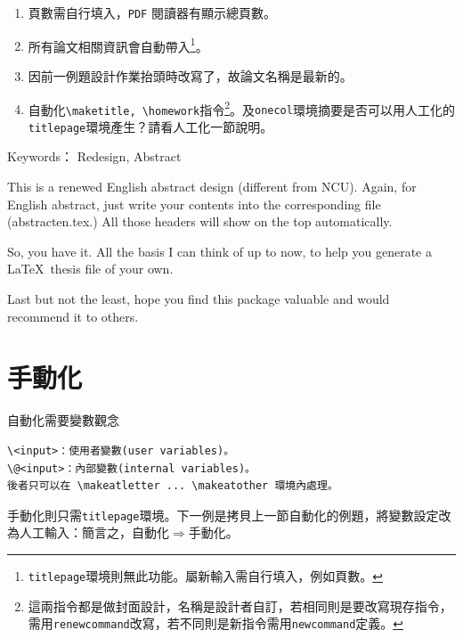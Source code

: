 \begin{appendB}
\begin{abstractcn}
\begin{enumerate}
\item 頁數需自行填入，{\tt PDF} 閱讀器有顯示總頁數。
\item 所有論文相關資訊會自動帶入\footnote{{\tt titlepage}環境則無此功能。屬新輸入需自行填入，例如頁數。}。
\item 因前一例題設計作業抬頭時改寫了，故論文名稱是最新的。
\item 自動化\verb|\maketitle, \homework|指令\footnote{這兩指令都是做封面設計，名稱是設計者自訂，若相同則是要改寫現存指令，需用{\tt {\color{red}re}newcommand}改寫，若不同則是新指令需用{\tt newcommand}定義。}。及{\tt onecol}環境摘要是否可以用人工化的{\tt titlepage}環境產生？請看人工化一節說明。
\end{enumerate}
\end{abstractcn}

\begin{abstracten}        %
Keywords： Redesign, Abstract
\vspace{2ex}

\quad  {}

This is a renewed English abstract design (different from NCU). Again, for English abstract, just write your contents into the corresponding file (abstracten.tex.) All those headers will show on the top automatically.

\quad 
So, you have it. All the basis I can think of up to now, to help you generate a \LaTeX\ thesis file of your own.

\quad Last but not the least, hope you find this package valuable and would recommend it to others. 
\end{abstracten}


\section{手動化} 
自動化需要變數觀念
\begin{verbatim}
\<input>：使用者變數(user variables)。
\@<input>：內部變數(internal variables)。
後者只可以在 \makeatletter ... \makeatother 環境內處理。
\end{verbatim}
手動化則只需{\tt titlepage}環境。下一例是拷貝上一節自動化的例題，將變數設定改為人工輸入：簡言之，自動化$\Rightarrow$手動化。


\end{appendB}
